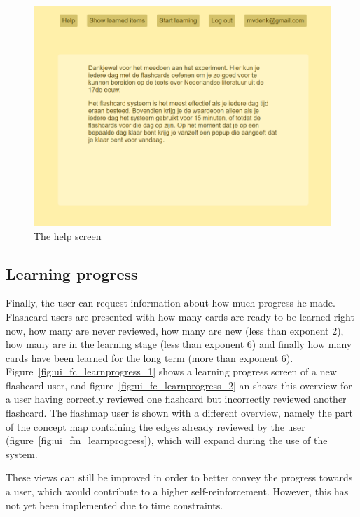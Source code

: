 \begin{figure}
    \centering
    \includegraphics[width=.8\textwidth]{img/ui_help.png}
    \caption{The help screen}
    \label{fig:ui_help}
\end{figure}

\subsection{Learning progress}
\label{sec:learningprogress}

Finally, the user can request information about how much progress he made. Flashcard users are presented with how many cards are ready to be learned right now, how many are never reviewed, how many are new (less than exponent 2), how many are in the learning stage (less than exponent 6) and finally how many cards have been learned for the long term (more than exponent 6). Figure~\ref{fig:ui_fc_learnprogress_1} shows a learning progress screen of a new flashcard user, and figure~\ref{fig:ui_fc_learnprogress_2} an shows this overview for a user having correctly reviewed one flashcard but incorrectly reviewed another flashcard. The flashmap user is shown with a different overview, namely the part of the concept map containing the edges already reviewed by the user (figure~\ref{fig:ui_fm_learnprogress}), which will expand during the use of the system.

These views can still be improved in order to better convey the progress towards a user, which would contribute to a higher self-reinforcement. However, this has not yet been implemented due to time constraints.

